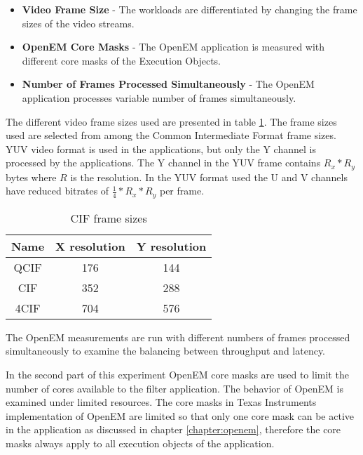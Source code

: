 \begin{itemize}
    \item \textbf{Video Frame Size} - The workloads are differentiated by changing the frame sizes of the video streams.
    \item \textbf{OpenEM Core Masks} - The OpenEM application is measured with different core masks of the Execution Objects.
    \item \textbf{Number of Frames Processed Simultaneously} - The OpenEM application processes variable number of frames simultaneously.
\end{itemize}

The different video frame sizes used are presented in table \ref{tab:cif_frames}. The frame sizes used are selected from among the Common Intermediate Format frame sizes.  YUV video format is used in the applications, but only the Y channel is processed by the applications. The Y channel in the YUV frame contains $R_{x} * R_{y}$ bytes where $R$ is the resolution. In the YUV format used the U and V channels have reduced bitrates of $\frac{1}{4} * R_{x} * R_{y}$ per frame.

\begin{table}
    \begin{center}
        \begin{tabular}{ c c c }
            Name  & X resolution  & Y resolution \\ \hline
            QCIF  & 176           & 144          \\ \hline
            CIF   & 352           & 288          \\ \hline
            4CIF  & 704           & 576          \\ \hline
        \end{tabular}
        \caption{CIF frame sizes}
        \label{tab:cif_frames}
    \end{center}
\end{table}

 The OpenEM measurements are run with different numbers of frames processed simultaneously to examine the balancing between throughput and latency.

In the second part of this experiment OpenEM core masks are used to limit the number of cores available to the filter application. The behavior of OpenEM is examined under limited resources. The core masks in Texas Instruments implementation of OpenEM are limited so that only one core mask can be active in the application as discussed in chapter \ref{chapter:openem}, therefore the core masks always apply to all execution objects of the application. 

